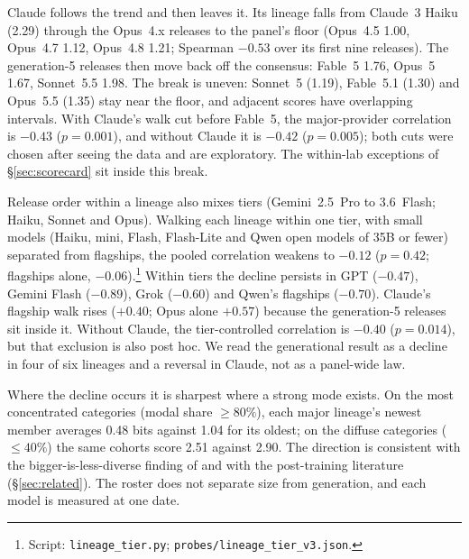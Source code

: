 \documentclass[11pt]{article}
\begin{document}
Claude follows the trend and then leaves it. Its lineage falls from Claude~3 Haiku (2.29) through the Opus~4.x releases to the panel's floor (Opus~4.5 1.00, Opus~4.7 1.12, Opus~4.8 1.21; Spearman $-0.53$ over its first nine releases). The generation-5 releases then move back off the consensus: Fable~5 1.76, Opus~5 1.67, Sonnet~5.5 1.98. The break is uneven: Sonnet~5 (1.19), Fable~5.1 (1.30) and Opus~5.5 (1.35) stay near the floor, and adjacent scores have overlapping intervals. With Claude's walk cut before Fable~5, the major-provider correlation is $-0.43$ ($p = 0.001$), and without Claude it is $-0.42$ ($p = 0.005$); both cuts were chosen after seeing the data and are exploratory. The within-lab exceptions of \S\ref{sec:scorecard} sit inside this break.

Release order within a lineage also mixes tiers (Gemini~2.5~Pro to 3.6~Flash; Haiku, Sonnet and Opus). Walking each lineage within one tier, with small models (Haiku, mini, Flash, Flash-Lite and Qwen open models of 35B or fewer) separated from flagships, the pooled correlation weakens to $-0.12$ ($p = 0.42$; flagships alone, $-0.06$).\footnote{Script: \texttt{lineage\_tier.py}; \texttt{probes/lineage\_tier\_v3.json}.} Within tiers the decline persists in GPT ($-0.47$), Gemini Flash ($-0.89$), Grok ($-0.60$) and Qwen's flagships ($-0.70$). Claude's flagship walk rises ($+0.40$; Opus alone $+0.57$) because the generation-5 releases sit inside it. Without Claude, the tier-controlled correlation is $-0.40$ ($p = 0.014$), but that exclusion is also post hoc. We read the generational result as a decline in four of six lineages and a reversal in Claude, not as a panel-wide law.

Where the decline occurs it is sharpest where a strong mode exists. On the most concentrated categories (modal share ${\geq}80\%$), each major lineage's newest member averages 0.48 bits against 1.04 for its oldest; on the diffuse categories (${\leq}40\%$) the same cohorts score 2.51 against 2.90. The direction is consistent with the bigger-is-less-diverse finding of \citet{zhang2025noveltybench} and with the post-training literature (\S\ref{sec:related}). The roster does not separate size from generation, and each model is measured at one date.
\end{document}

